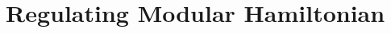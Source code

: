 \documentclass[a4paper,11pt]{article}
\theoremstyle{definition}
\begin{document}







\section{Regulating Modular Hamiltonian}\label{sec:regulate}
\end{document}
